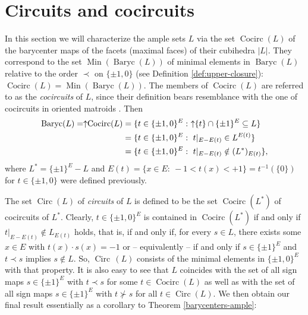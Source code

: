 \documentclass[11pt,a4paper]{amsart}
\theoremstyle{definition}
\numberwithin{equation}{section}
\DeclareMathOperator{\Baryc}{Baryc}
\DeclareMathOperator{\Cocirc}{Cocirc}
\DeclareMathOperator{\Circ}{Circ}
\DeclareMathOperator{\Min}{Min}
\newcommand{\covectors}{\ensuremath{L}}
\begin{document}
\section{Circuits and cocircuits}\label{circuit-cocircuit}

In this section we will characterize the ample sets $\covectors$ via the set $\Cocirc(\covectors)$ of the barycenter maps of the facets (maximal faces) of their cubihedra $|\covectors|$. They correspond to the set  $\Min(\Baryc(\covectors))$ of minimal elements in $\Baryc(\covectors)$ relative to the order $\prec$ on $\{ \pm 1, 0\}$ (see Definition \ref{def:upper-closure}): $\Cocirc(\covectors)=\Min(\Baryc(\covectors))$.
The members of $\Cocirc(\covectors)$ are referred to as the {\it cocircuits} of $\covectors$, since their definition bears resemblance with the one of cocircuits in  oriented matroids \cite{BjLVStWhZi}. %
Then
\begin{align*} \Baryc(\covectors)=\uparrow\hspace*{-0.1cm}\Cocirc(\covectors)&=\{ t\in \{ \pm 1,0\}^E: ~\uparrow\hspace*{-0.1cm}\{ t\}\cap \{ \pm 1\}^E\subseteq \covectors\}\\
&=\{ t\in \{ \pm 1,0\}^E: ~t|_{E-E(t)}\in \covectors^{E(t)}\}\\
&=\{ t\in \{ \pm 1,0\}^E: ~t|_{E-E(t)}\notin (\covectors^*)_{E(t)}\},
\end{align*}
where ${\covectors}^*=\{ \pm 1\}^E-\covectors$ and $E(t)=\{ x\in E: ~-1<t(x)<+1\}=t^{-1}(\{ 0\})$ for $t\in \{ \pm 1,0\}$ were defined previously.

The set $\Circ(\covectors)$ of {\it circuits} of ${\covectors}$ is
defined to be the set $\Cocirc(\covectors^*)$ of cocircuits of ${\covectors}^*$.
Clearly, $t\in \{ \pm 1,0\}^E$ is contained in $\Cocirc(\covectors^*)$
if and only if $t|_{E-E(t)}\notin {\covectors}_{E(t)}$ holds, that is, if and only
if, for every $s\in \covectors$, there exists some $x\in E$ with
$t(x)\cdot s(x)=-1$ or -- equivalently -- if and only if $s\in
\{ \pm 1\}^E$ and $t\prec s$ implies $s\notin \covectors.$ So, $\Circ\,({\covectors})$ consists of the minimal elements in $\{ \pm 1,0\} ^E$ with that
property. It is also easy to see that $\covectors$ coincides with the set of all
sign maps $s\in \{ \pm 1\}^E$ with $t\prec s$ for some $t\in \Cocirc({\covectors})$
as well as with the set of all sign maps $s\in \{ \pm 1\}^E$ with
$t\nsucc s$ for all $t\in \Circ(\covectors)$. We then obtain our final result
essentially as a corollary to Theorem \ref{barycenters-ample}:
\end{document}
